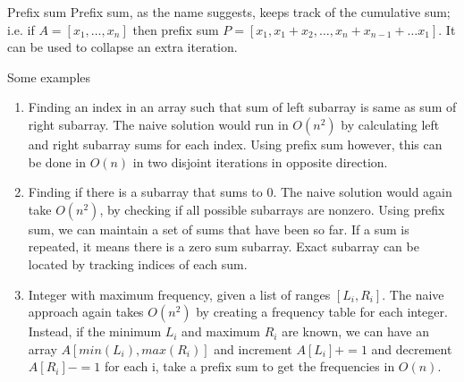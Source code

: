 \documentclass[titlepage, 12pt]{article}
\begin{document}
\begin{algorithm}{Prefix sum}{}
    Prefix sum, as the name suggests, keeps track of the cumulative sum; i.e. if
    $A =  [x_1,\dots,x_n]$ then prefix sum $P = [x_1, x_1 + x_2,\dots,x_n + x_{n
    - 1} + \dots x_1]$. It can be used to collapse an extra iteration.

    Some examples
    \begin{enumerate}
        \item Finding an index in an array such that sum of left subarray is
            same as sum of right subarray. The naive solution would run in
            $O(n^2)$ by calculating left and right subarray sums for each index.
            Using prefix sum however, this can be done in $O(n)$ in two disjoint
            iterations in opposite direction.
        \item Finding if there is a subarray that sums to 0. The naive solution
            would again take $O(n^2)$, by checking if all possible subarrays are
            nonzero. Using prefix sum, we can maintain a set of sums that have
            been so far. If a sum is repeated, it means there is a zero sum
            subarray. Exact subarray can be located by tracking indices of each
            sum.
        \item Integer with maximum frequency, given a list of ranges $[L_i,
            R_i]$. The naive approach again takes $O(n^2)$ by creating a
            frequency table for each integer. Instead, if the minimum $L_i$ and
            maximum $R_i$ are known, we can have an array $A[min(L_i),
            max(R_i)]$ and increment $A[L_i] += 1$ and decrement $A[R_i] -= 1$
            for each i, take a prefix sum to get the frequencies in $O(n)$.
    \end{enumerate}
\end{algorithm}
\end{document}
